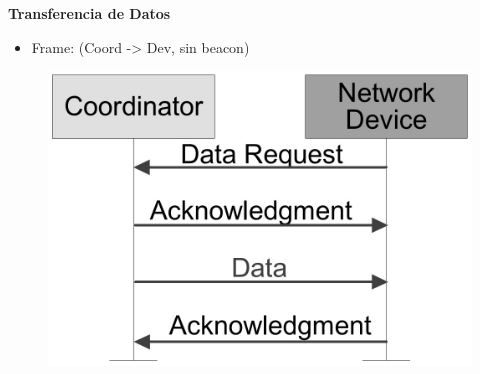 \documentclass[aspectratio=169]{beamer}
\begin{document}
\begin{frame}{\textbf{Transferencia de Datos}}
\begin{minipage}[c]{1.0\linewidth}
	\begin{minipage}[c]{0.6\linewidth}
		\begin{itemize}
			\item Frame: (Coord -> Dev, sin beacon)
			\vspace{10px}
	  	\end{itemize}	
	\end{minipage}
	\begin{minipage}[c]{0.35\linewidth}
		\begin{figure}[H]
			\includegraphics[width=1\textwidth]{./imagenes/coord-dev-sinbeacon.jpg}
		\end{figure}	  	  	
	\end{minipage}
\end{minipage}
\end{frame}
\end{document}
